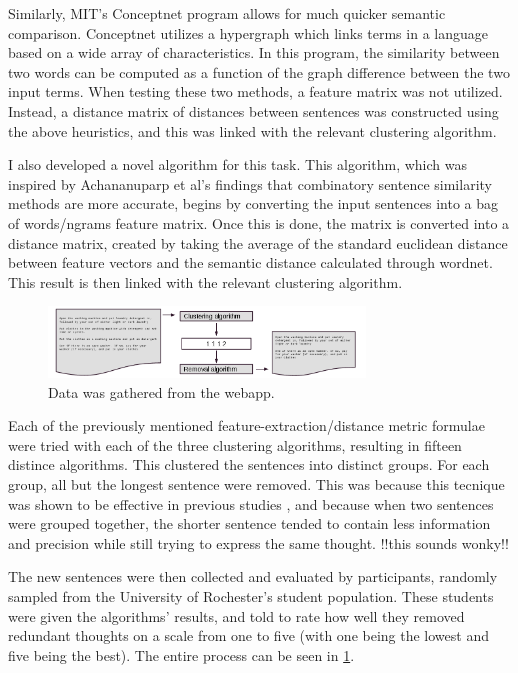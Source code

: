 Similarly, MIT's Conceptnet program allows for much quicker semantic comparison. 
Conceptnet utilizes a hypergraph which links terms in a language based on a wide array of characteristics.
In this program, the similarity between two words can be computed as a function of the graph difference between the two input terms.
When testing these two methods, a feature matrix was not utilized.
Instead, a distance matrix of distances between sentences was constructed using the above heuristics, and this was linked with the relevant clustering algorithm.

I also developed a novel algorithm for this task. This algorithm, which was inspired by Achananuparp et al's findings that combinatory sentence similarity methods are  more accurate, begins by converting the input sentences into a bag of words/ngrams feature matrix.
Once this is done, the matrix is converted into a distance matrix, created by taking the average of the standard euclidean distance between feature vectors and the semantic distance calculated through wordnet.
This result is then linked with the relevant clustering algorithm.

\begin{figure}
	\begin{center}
	\includegraphics[width=0.75\textwidth]{figures/sorter.png}
	\caption{Data was gathered from the webapp.}
	\label{fig:sorter}
	\end{center}
\end{figure}

Each of the previously mentioned feature-extraction/distance metric formulae were tried with each of the three clustering algorithms, resulting in fifteen distince algorithms. 
This clustered the sentences into distinct groups.
For each group, all but the longest sentence were removed.
This was because this tecnique was shown to be effective in previous studies \cite{toolscape}, and because when two sentences were grouped together, the shorter sentence tended to contain less information and precision while still trying to express the same thought. !!this sounds wonky!!

The new sentences were then collected and evaluated by participants, randomly sampled from the University of Rochester's student population. 
These students were given the algorithms' results, and told to rate how well they removed redundant thoughts on a scale from one to five (with one being the lowest and five being the best).
The entire process can be seen in \ref{fig:sorter}.


%
